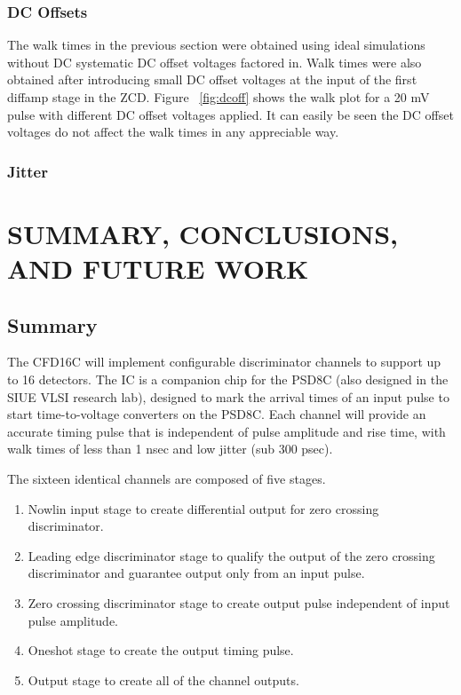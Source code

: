 \documentclass[12pt,oneside,final]{siuethesis}
\theoremstyle{definition}
\begin{document}
\subsection{DC Offsets}
\par The walk times in the previous section were obtained using ideal simulations without DC systematic DC offset voltages factored in. Walk times were also obtained after introducing small DC offset voltages at the input of the first diffamp stage in the ZCD. Figure ~\ref{fig:dcoff} shows the walk plot for a 20 mV pulse with different DC offset voltages applied. It can easily be seen the DC offset voltages do not affect the walk times in any appreciable way.
\subsection{Jitter}

\chapter{SUMMARY, CONCLUSIONS, AND FUTURE WORK}

\section{Summary}
\par The CFD16C will implement configurable discriminator channels to support up to 16 detectors. The IC is a companion chip for the PSD8C (also designed in the SIUE VLSI research lab), designed to mark the arrival times of an input pulse to start time-to-voltage converters on the PSD8C. Each channel will provide an accurate timing pulse that is independent of pulse amplitude and rise time, with walk times of less than 1 nsec and low jitter (sub 300 psec).
\par The sixteen identical channels are composed of five stages. 
\begin{enumerate}
\item
Nowlin input stage to create differential output for zero crossing discriminator.
\item
Leading edge discriminator stage to qualify the output of the zero crossing discriminator and guarantee output only from an input pulse.
\item
Zero crossing discriminator stage to create output pulse independent of input pulse amplitude.
\item
Oneshot stage to create the output timing pulse.
\item
Output stage to create all of the channel outputs.
\end{enumerate}
\end{document}
